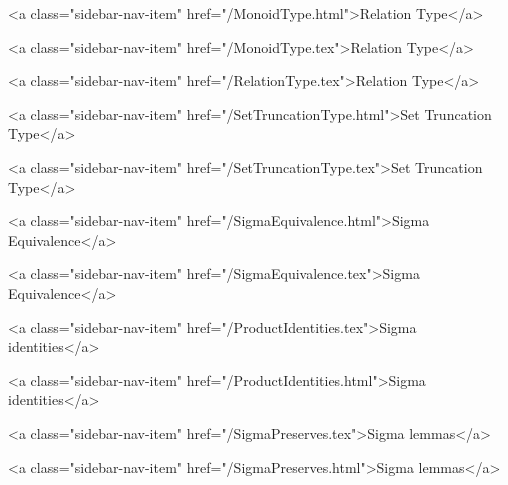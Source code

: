       
    
      
        
          <a class="sidebar-nav-item" href="/MonoidType.html">Relation Type</a>
        
      
    
      
        
          <a class="sidebar-nav-item" href="/MonoidType.tex">Relation Type</a>
        
      
    
      
        
          <a class="sidebar-nav-item" href="/RelationType.tex">Relation Type</a>
        
      
    
      
        
          <a class="sidebar-nav-item" href="/SetTruncationType.html">Set Truncation Type</a>
        
      
    
      
        
          <a class="sidebar-nav-item" href="/SetTruncationType.tex">Set Truncation Type</a>
        
      
    
      
        
          <a class="sidebar-nav-item" href="/SigmaEquivalence.html">Sigma Equivalence</a>
        
      
    
      
        
          <a class="sidebar-nav-item" href="/SigmaEquivalence.tex">Sigma Equivalence</a>
        
      
    
      
        
          <a class="sidebar-nav-item" href="/ProductIdentities.tex">Sigma identities</a>
        
      
    
      
        
          <a class="sidebar-nav-item" href="/ProductIdentities.html">Sigma identities</a>
        
      
    
      
        
          <a class="sidebar-nav-item" href="/SigmaPreserves.tex">Sigma lemmas</a>
        
      
    
      
        
          <a class="sidebar-nav-item" href="/SigmaPreserves.html">Sigma lemmas</a>
        
